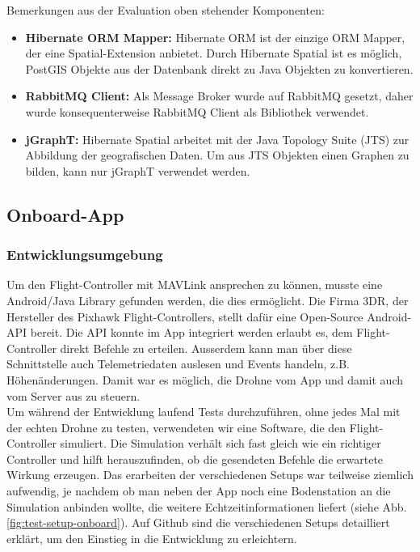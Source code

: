 Bemerkungen aus der Evaluation oben stehender Komponenten:
\begin{itemize}
	\item{\textbf{Hibernate ORM Mapper:} Hibernate ORM ist der einzige ORM Mapper, der eine Spatial-Extension anbietet. Durch Hibernate Spatial ist es möglich, PostGIS Objekte aus der Datenbank direkt zu Java Objekten zu konvertieren.}
	\item{\textbf{RabbitMQ Client:} Als Message Broker wurde auf RabbitMQ gesetzt, daher wurde konsequenterweise RabbitMQ Client als Bibliothek verwendet.}
	\item{\textbf{jGraphT:} Hibernate Spatial arbeitet mit der \Gls{Java Topology Suite} (JTS) zur Abbildung der geografischen Daten. Um aus JTS Objekten einen Graphen zu bilden, kann nur jGraphT verwendet werden.}
\end{itemize}

\subsection{Onboard-App}

\subsubsection{Entwicklungsumgebung}
Um den \Gls{Flight-Controller} mit \Gls{MAVLink} ansprechen zu können, musste eine Android/Java Library gefunden werden, die dies ermöglicht. Die Firma 3DR, der Hersteller des Pixhawk Flight-Controllers, stellt dafür eine Open-Source Android-API bereit. Die API konnte im App integriert werden erlaubt es, dem Flight-Controller direkt Befehle zu erteilen. Ausserdem kann man über diese Schnittstelle auch Telemetriedaten auslesen und Events handeln, z.B. Höhenänderungen. Damit war es möglich, die Drohne vom App und damit auch vom Server aus zu steuern.\\

Um während der Entwicklung laufend Tests durchzuführen, ohne jedes Mal mit der echten Drohne zu testen, verwendeten wir eine Software, die den Flight-Controller simuliert. Die Simulation verhält sich fast gleich wie ein richtiger Controller und hilft herauszufinden, ob die gesendeten Befehle die erwartete Wirkung erzeugen. Das erarbeiten der verschiedenen Setups war teilweise ziemlich aufwendig, je nachdem ob man neben der App noch eine Bodenstation an die Simulation anbinden wollte, die weitere Echtzeitinformationen liefert (siehe Abb. \ref{fig:test-setup-onboard}). Auf Github sind die verschiedenen Setups detailliert erklärt, um den Einstieg in die Entwicklung zu erleichtern.

